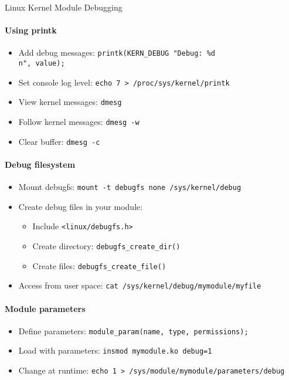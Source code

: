 \begin{KR}{Linux Kernel Module Debugging}\\
    \paragraph{Using printk}
    \begin{itemize}
        \item Add debug messages: \texttt{printk(KERN\_DEBUG "Debug: \%d\\n", value);}
        \item Set console log level: \texttt{echo 7 > /proc/sys/kernel/printk}
        \item View kernel messages: \texttt{dmesg}
        \item Follow kernel messages: \texttt{dmesg -w}
        \item Clear buffer: \texttt{dmesg -c}
    \end{itemize}
    
    \paragraph{Debug filesystem}
    \begin{itemize}
        \item Mount debugfs: \texttt{mount -t debugfs none /sys/kernel/debug}
        \item Create debug files in your module:
            \begin{itemize}
                \item Include \texttt{<linux/debugfs.h>}
                \item Create directory: \texttt{debugfs\_create\_dir()}
                \item Create files: \texttt{debugfs\_create\_file()}
            \end{itemize}
        \item Access from user space: \texttt{cat /sys/kernel/debug/mymodule/myfile}
    \end{itemize}
    
    \paragraph{Module parameters}
    \begin{itemize}
        \item Define parameters: \texttt{module\_param(name, type, permissions);}
        \item Load with parameters: \texttt{insmod mymodule.ko debug=1}
        \item Change at runtime: \texttt{echo 1 > /sys/module/mymodule/parameters/debug}
    \end{itemize}
    

\end{KR}
